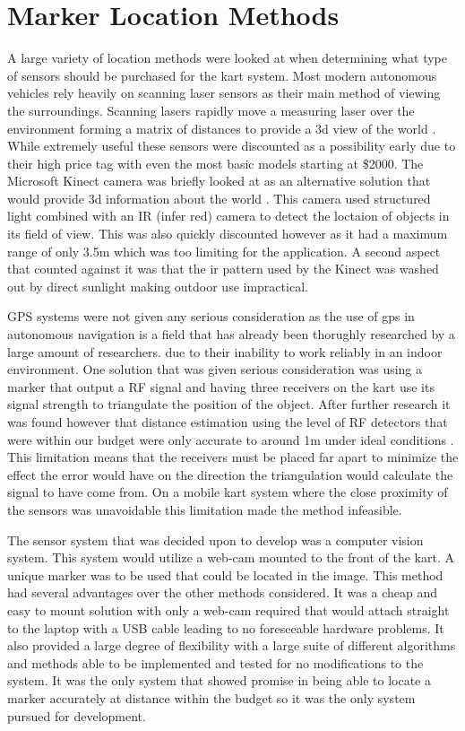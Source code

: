 \section{Marker Location Methods}

A large variety of location methods were looked at when determining what type of sensors should be purchased for the kart system. Most modern autonomous vehicles rely heavily on scanning laser sensors as their main method of viewing the surroundings. Scanning lasers rapidly move a measuring laser over the environment forming a matrix of distances to provide a 3d view of the world \cite{laser}. While extremely useful these sensors were discounted as a possibility early due to their high price tag with even the most basic models starting at \$2000. The Microsoft Kinect camera was briefly looked at as an alternative solution that would provide 3d information about the world \cite{kinect}. This camera used structured light combined with an IR (infer red) camera to detect the loctaion of objects in its field of view. This was also quickly discounted however as it had a maximum range of only 3.5m which was too limiting for the application. A second aspect that counted against it was that the ir pattern used by the Kinect was washed out by direct sunlight making outdoor use impractical.

GPS systems were not given any serious consideration as the use of gps in autonomous navigation is a field that has already been thorughly researched by a large amount of researchers. due to their inability to work reliably in an indoor environment. One solution that was given serious consideration was using a marker that output a RF signal and having three receivers on the kart use its signal strength to triangulate the position of the object. After further research it was found however that distance estimation using the level of RF detectors that were within our budget were only accurate to around 1m under ideal conditions \cite{rf}. This limitation means that the receivers must be placed far apart to minimize the effect the error would have on the direction the triangulation would calculate the signal to have come from. On a mobile kart system where the close proximity of the sensors was unavoidable this limitation made the method infeasible.

The sensor system that was decided upon to develop was a computer vision system. This system would utilize a web-cam mounted to the front of the kart. A unique marker was to be used that could be located in the image. This method had several advantages over the other methods considered. It was a cheap and easy to mount solution with only a web-cam required that would attach straight to the laptop with a USB cable leading to no foreseeable hardware problems. It also provided a large degree of flexibility with a large suite of different algorithms and methods able to be implemented and tested for no modifications to the system. It was the only system that showed promise in being able to locate a marker accurately at distance within the budget so it was the only system pursued for development.